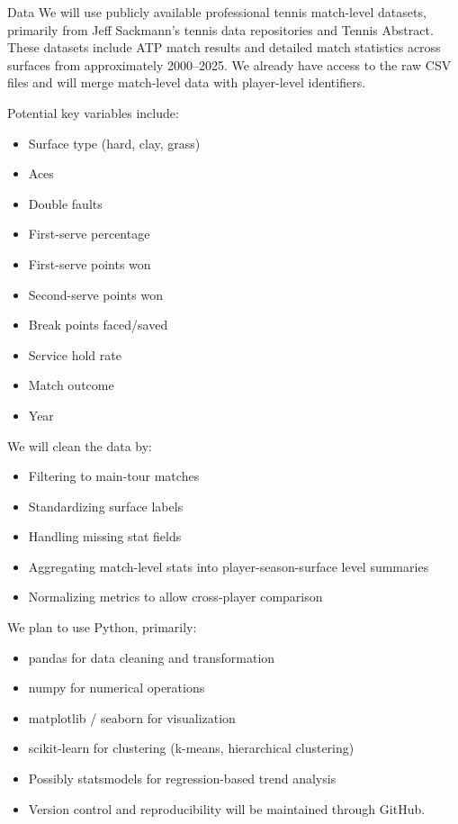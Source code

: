 \documentclass[12pt]{article}
\begin{document}
{\color{black}
Data
We will use publicly available professional tennis match-level datasets, primarily from Jeff Sackmann’s tennis data repositories and Tennis Abstract. These datasets include ATP match results and detailed match statistics across surfaces from approximately 2000–2025. We already have access to the raw CSV files and will merge match-level data with player-level identifiers. 

Potential key variables include:

\begin{itemize}
    \item Surface type (hard, clay, grass)
    \item Aces
    \item Double faults
    \item First-serve percentage
    \item First-serve points won
    \item Second-serve points won
    \item Break points faced/saved
    \item Service hold rate
    \item Match outcome
    \item Year
\end{itemize}


We will clean the data by:

\begin{itemize}
    \item Filtering to main-tour matches
    \item Standardizing surface labels
    \item Handling missing stat fields
    \item Aggregating match-level stats into player-season-surface level summaries
    \item Normalizing metrics to allow cross-player comparison
\end{itemize}

We plan to use Python, primarily:

\begin{itemize}
    \item pandas for data cleaning and transformation
    \item numpy for numerical operations
    \item matplotlib / seaborn for visualization
    \item scikit-learn for clustering (k-means, hierarchical clustering)
    \item Possibly statsmodels for regression-based trend analysis
    \item Version control and reproducibility will be maintained through GitHub.
\end{itemize}
}
\end{document}
